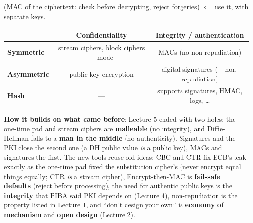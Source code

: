 \begin{recapbox}[title={Exam-ready recap --- Lecture 6: Applied cryptography II}]
\begin{itemize}
        (MAC of the ciphertext: check before decrypting, reject forgeries) $\Leftarrow$ use it,
        with separate keys.
\end{itemize}
\begin{center}
\small
\begin{tabular}{l|c|c}
                      & \textbf{Confidentiality}         & \textbf{Integrity / authentication} \\ \hline
\textbf{Symmetric}    & stream ciphers, block ciphers + mode & MACs (no non-repudiation) \\
\textbf{Asymmetric}   & public-key encryption            & digital signatures (+ non-repudiation) \\
\textbf{Hash}         & ---                              & supports signatures, HMAC, logs, \ldots
\end{tabular}
\end{center}
\textbf{How it builds on what came before}: Lecture 5 ended with two holes: the one-time pad and
stream ciphers are \textbf{malleable} (no integrity), and Diffie-Hellman falls to a
\textbf{man in the middle} (no authenticity). Signatures and the PKI close the second one (a DH
public value \emph{is} a public key), MACs and signatures the first. The new tools reuse old
ideas: CBC and CTR fix ECB's leak exactly as the one-time pad fixed the substitution cipher's
(never encrypt equal things equally; CTR \emph{is} a stream cipher), Encrypt-then-MAC is
\textbf{fail-safe defaults} (reject before processing), the need for authentic public keys is
the \textbf{integrity} that BIBA said PKI depends on (Lecture 4), non-repudiation is the property
listed in Lecture 1, and ``don't design your own'' is \textbf{economy of mechanism} and
\textbf{open design} (Lecture 2).
\end{recapbox}
